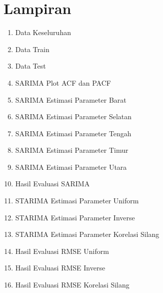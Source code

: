 \chapter*{Lampiran}
\begin{enumerate}
    \item Data Keseluruhan
    

    \item Data Train
    

    \item Data Test
    

    \item SARIMA Plot ACF dan PACF
    

    \item SARIMA Estimasi Parameter Barat
    
    
    \item SARIMA Estimasi Parameter Selatan
    
    
    \item SARIMA Estimasi Parameter Tengah
    
    
    \item SARIMA Estimasi Parameter Timur
    
    
    \item SARIMA Estimasi Parameter Utara
    

    \item Hasil Evaluasi SARIMA
    

    \item STARIMA Estimasi Parameter Uniform
    
    
    \item STARIMA Estimasi Parameter Inverse
    
    
    \item STARIMA Estimasi Parameter Korelasi Silang
    

    \item Hasil Evaluasi RMSE Uniform
    
    
    \item Hasil Evaluasi RMSE Inverse
    
    
    \item Hasil Evaluasi RMSE Korelasi Silang
    
\end{enumerate}